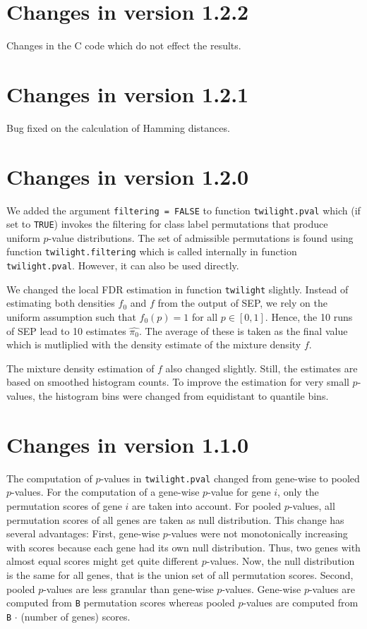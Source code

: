 \documentclass[11pt,a4paper,fleqn]{report}
\newcommand{\Rfunction}[1]{{\texttt{#1}}}
\newcommand{\Rfunarg}[1]{{\texttt{#1}}}
\begin{document}
\section*{Changes in version 1.2.2}

Changes in the C code which do not effect the results.


\section*{Changes in version 1.2.1}

Bug fixed on the calculation of Hamming distances.


\section*{Changes in version 1.2.0}

We added the argument \Rfunarg{filtering = FALSE} to function \Rfunction{twilight.pval} which (if set to \Rfunarg{TRUE}) invokes the filtering for class label permutations that produce uniform $p$-value distributions. The set of admissible permutations is found using function \Rfunarg{twilight.filtering} which is called internally in function \Rfunarg{twilight.pval}. However, it can also be used directly.

We changed the local FDR estimation in function \Rfunction{twilight} slightly. Instead of estimating both densities $f_0$ and $f$ from the output of SEP, we rely on the uniform assumption such that $f_0(p)=1$ for all $p \in [0,1]$. Hence, the 10 runs of SEP lead to 10 estimates $\widehat{\pi_0}$. The average of these is taken as the final value which is mutliplied with the density estimate of the mixture density $f$.

The mixture density estimation of $f$ also changed slightly. Still, the estimates are based on smoothed histogram counts. To improve the estimation for very small $p$-values, the histogram bins were changed from equidistant to quantile bins.
       
       
\section*{Changes in version 1.1.0}

The computation of $p$-values in \Rfunction{twilight.pval} changed from gene-wise to pooled $p$-values. For the computation of a gene-wise $p$-value for gene $i$, only the permutation scores of gene $i$ are taken into account. For pooled $p$-values, all permutation scores of all genes are taken as null distribution. This change has several advantages: First, gene-wise $p$-values were not monotonically increasing with scores because each gene had its own null distribution. Thus, two genes with almost equal scores might get quite different $p$-values. Now, the null distribution is the same for all genes, that is the union set of all permutation scores. Second, pooled $p$-values are less granular than gene-wise $p$-values. Gene-wise $p$-values are computed from \Rfunarg{B} permutation scores whereas pooled $p$-values are computed from \Rfunarg{B} $\cdot$ (number of genes) scores.
\end{document}
